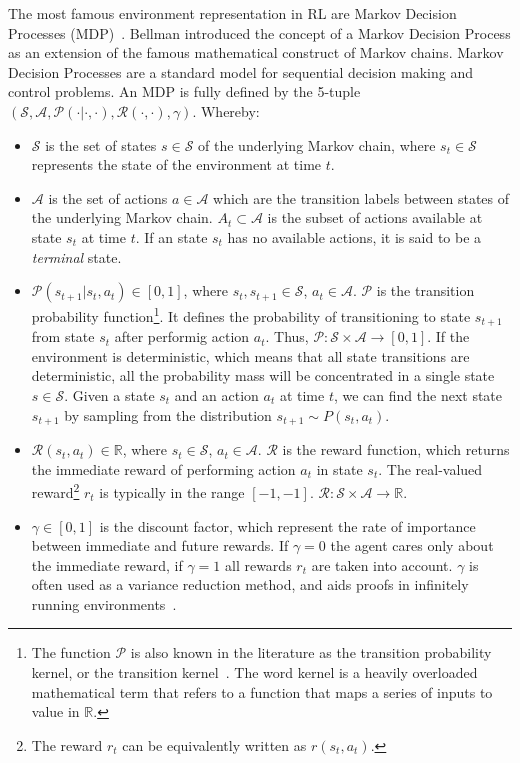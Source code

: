 \documentclass{../main.tex}{subfiles}
\begin{document}
The most famous environment representation in RL are Markov Decision Processes (MDP)~\citep{Bellman1957}. Bellman introduced the concept of a Markov Decision Process as an extension of the famous mathematical construct of Markov chains. Markov Decision Processes are a standard model for sequential decision making and control problems. An MDP is fully defined by the 5-tuple $(\mathcal{S}, \mathcal{A}, \mathcal{P(\cdot | \cdot, \cdot)}, \mathcal{R(\cdot, \cdot)}, \gamma)$. Whereby:

\begin{itemize}
\item $\mathcal{S}$ is the set of states $s \in \mathcal{S}$ of the underlying Markov chain, where $s_t \in \mathcal{S}$ represents the state of the environment at time $t$.
\item $\mathcal{A}$ is the set of actions $a \in \mathcal{A}$ which are the transition labels between states of the underlying Markov chain. $A_t \subset \mathcal{A}$ is the subset of actions available at state $s_t$ at time $t$. If an state $s_t$ has no available actions, it is said to be a \textit{terminal} state.
\item $\mathcal{P}(s_{t+1} | s_t, a_t) \in [0, 1]$, where $s_t, s_{t+1} \in \mathcal{S}$, $a_t \in \mathcal{A}$. $\mathcal{P}$ is the transition probability function\footnote{The function $\mathcal{P}$ is also known in the literature as the transition probability kernel, or the transition kernel~\citep{Tamar2017}. The word kernel is a heavily overloaded mathematical term that refers to a function that maps a series of inputs to value in $\mathbb{R}$.}. It defines the probability of transitioning to state $s_{t+1}$ from state $s_t$ after performig action $a_t$. Thus, $\mathcal{P}: \mathcal{S} \times \mathcal{A} \to [0,1]$. If the environment is deterministic, which means that all state transitions are deterministic, all the probability mass will be concentrated in a single state $s \in \mathcal{S}$. Given a state $s_t$ and an action $a_t$ at time $t$, we can find the next state $s_{t+1}$ by sampling from the distribution $s_{t+1} \sim P(s_t, a_t)$.%
\item $\mathcal{R}(s_t, a_t) \in \mathbb{R}$, where $s_t \in \mathcal{S}$, $a_t \in \mathcal{A}$. $\mathcal{R}$ is the reward function, which returns the immediate reward of performing action $a_t$ in state $s_t$. The real-valued reward\footnote{The reward $r_t$ can be equivalently written as $r(s_t, a_t)$.} $r_t$ is typically in the range $[-1,-1]$. $\mathcal{R}: \mathcal{S} \times \mathcal{A} \to \mathbb{R}$.
\item $\gamma \in [0,1]$ is the discount factor, which represent the rate of importance between immediate and future rewards. If $\gamma = 0$ the agent cares only about the immediate reward, if $\gamma = 1$ all rewards $r_t$ are taken into account. $\gamma$ is often used as a variance reduction method, and aids proofs in infinitely running environments~\citep{Sutton1999}.
\end{itemize}
\end{document}
